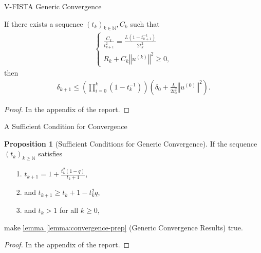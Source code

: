 \documentclass[11pt]{beamer}
\theoremstyle{definition}
\newtheorem{prop}{Proposition}[section]
\begin{document}
    \begin{frame}{V-FISTA Generic Convergence}
        \begin{lemma}\label{lemma:convergence-prep}
            If there exists a sequence $(t_k)_{k\in \mathbb N}, C_k$ such that 
            \begin{align}
                \begin{cases}
                    \frac{C_k}{t_{k + 1}^2} = \frac{L(1 - t^{-1}_{k + 1})}{2t_{k}^2}
                    \\
                    R_k + C_k\left\Vert
                        u^{(k)}
                    \right\Vert^2 \ge 0, 
                \end{cases}
            \end{align}
            then 
            \begin{align*}
                \delta_{k + 1}
                \le 
                \left(
                    \prod_{i = 0}^{k} (1 - t_k^{-1})
                \right)\left(
                    \delta_0 + \frac{L}{2t_0^2}\left\Vert
                        u^{(0)}
                    \right\Vert^2
                \right). 
            \end{align*}
        \end{lemma}
        \begin{proof}
            In the appendix of the report. 
        \end{proof}
    \end{frame}
    \begin{frame}{A Sufficient Condition for Convergence}
        \begin{prop}[Sufficient Conditions for Generic Convergence]
            If the sequence $(t_k)_{k \ge \mathbb N}$ satisfies 
            \begin{itemize}
                \item [1.] $t_{k + 1} = 1 + \frac{t_k^2(1 - q)}{t_k + 1}$, 
                \item [2.] and $t_{k + 1} \ge t_k + 1 - t_k^2q$, 
                \item [3.] and $t_k > 1$ for all $k\ge 0$, 
            \end{itemize}
            make \hyperref[lemma:convergence-prep]{lemma \ref*{lemma:convergence-prep}} (Generic Convergence Results) true. 
        \end{prop}
        \begin{proof}
            In the appendix of the report. 
        \end{proof}
    \end{frame}
\end{document}
